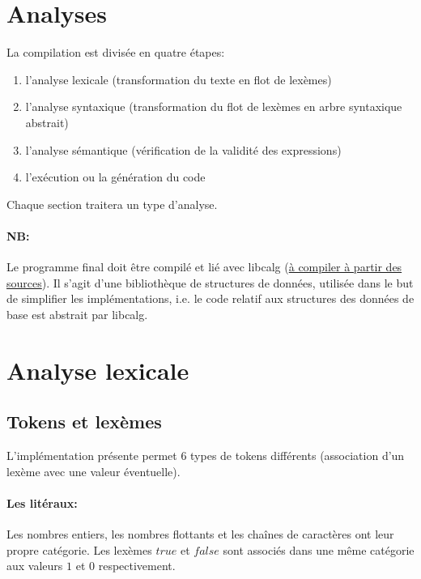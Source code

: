 \documentclass[paper=a4, fontsize=11pt]{scrartcl}
\numberwithin{equation}{section}		%
\numberwithin{figure}{section}			%
\numberwithin{table}{section}				%
\begin{document}
\newpage
\section{Analyses}

La compilation est divisée en quatre étapes:

\begin{enumerate}
\item l'analyse lexicale (transformation du texte en flot de lexèmes)
\item l'analyse syntaxique (transformation du flot de lexèmes en arbre syntaxique abstrait)
\item l'analyse sémantique (vérification de la validité des expressions)
\item l'exécution ou la génération du code
\end{enumerate}

Chaque section traitera un type d'analyse.

\paragraph{NB:}
Le programme final doit être compilé et lié avec libcalg (\href{https://github.com/fragglet/c-algorithms}{à compiler à partir des sources}).
Il s'agit d'une bibliothèque de structures de données, utilisée dans le but de simplifier les implémentations, i.e. le code relatif aux structures des données de base est abstrait par libcalg.

\newpage
\section{Analyse lexicale}

\subsection{Tokens et lexèmes}

L'implémentation présente permet 6 types de tokens différents (association d'un lexème avec une valeur éventuelle).

\paragraph{Les litéraux:}
Les nombres entiers, les nombres flottants et les chaînes de caractères ont leur propre catégorie.
Les lexèmes $true$ et $false$ sont associés dans une même catégorie aux valeurs $1$ et $0$ respectivement.
\end{document}
